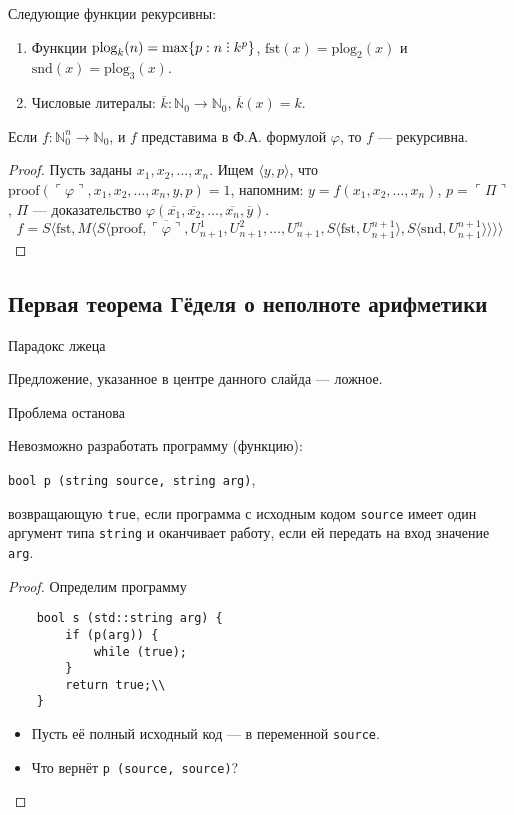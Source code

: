 \begin{lemma}
    Следующие функции рекурсивны:
\begin{enumerate}
\item Функции $\text{plog}_k(n) = \max\{p: n \divisible k^p\}$, $\text{fst}(x) = \text{plog}_2(x)$ и $\text{snd}(x) = \text{plog}_3(x)$.
\item Числовые литералы: $\overline{k}: \mathbb{N}_0 \rightarrow \mathbb{N}_0$, $\overline{k}(x) = k$.
\end{enumerate}
\end{lemma}

\begin{theorem}
    Если $f: \mathbb{N}^n_0\rightarrow\mathbb{N}_0$, и $f$ представима в Ф.А. формулой $\varphi$, то $f$ --- рекурсивна.
\end{theorem}
\begin{proof}
Пусть заданы $x_1,x_2,\dots,x_n$. Ищем $\langle y, p\rangle$,
что $\text{proof}(\ulcorner\varphi\urcorner,x_1,x_2,\dots,x_n,y,p)=1$,
напомним: $y = f(x_1,x_2,\dots,x_n)$, $p = \ulcorner\Pi\urcorner$,
$\Pi$ --- доказательство $\varphi(\overline{x_1},\overline{x_2},\dots,\overline{x_n},\overline{y})$.
$$f = S \langle \text{fst}, M\langle S \langle \text{proof}, \overline{\ulcorner\varphi\urcorner}, U^1_{n+1}, U^2_{n+1}, \dots, U^n_{n+1},
  S \langle \text{fst},U^{n+1}_{n+1}\rangle, S\langle \text{snd}, U^{n+1}_{n+1}\rangle \rangle \rangle \rangle$$
\end{proof}


\subsection{Первая теорема Гёделя о неполноте арифметики}


{Парадокс лжеца}
\begin{center}
    Предложение, указанное в центре данного слайда --- ложное.
\end{center}


{Проблема останова}
\begin{theorem}
    Невозможно разработать программу (функцию):
    \begin{center} \texttt{bool p (string source, string arg)},\end{center}
возвращающую \texttt{true}, если программа с исходным кодом \texttt{source} имеет один аргумент
типа \texttt{string} и оканчивает работу, если ей передать на вход значение \texttt{arg}.
\end{theorem}

\begin{proof}
Определим программу
\begin{verbatim}
    bool s (std::string arg) {
        if (p(arg)) {
            while (true);
        }
        return true;\\
    }
\end{verbatim}
\begin{itemize}
\item Пусть её полный исходный код --- в переменной \texttt{source}.
\item Что вернёт \texttt{p (source, source)}?
\end{itemize}
\end{proof}


